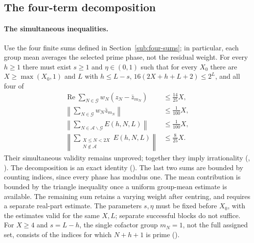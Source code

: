\subsection{The four-term decomposition}\label{sub:pivot}

\paragraph{The simultaneous inequalities.}
Use the four finite sums defined in Section~\ref{sub:four-sums}; in
particular, each group mean averages the selected prime phase, not the
residual weight. For every $h\ge 1$ there must exist $s\ge 1$ and $\eta\in(0,1)$ such that for
every $X_0$ there are $X\ge\max(X_0,1)$ and $L$ with $h\le L-s$,
$16(2X+h+L+2)\le 2^{L}$, and all four of
\[
\begin{aligned}
 \operatorname{Re}\sum_{N\in\mathcal G}w_N(z_N-\bar z_{m_N})
   &\le\tfrac{14}{25}X,\\
 \left\lVert\sum_{N\in\mathcal G}w_N\bar z_{m_N}\right\rVert
   &\le\tfrac{1}{100}X,\\
 \left\lVert\sum_{N\in\mathcal A\smallsetminus\mathcal G}E(h,N,L)\right\rVert
   &\le\tfrac{1}{100}X,\\
 \left\lVert\sum_{\substack{X\le N<2X\\N\notin\mathcal A}}E(h,N,L)\right\rVert
   &\le\tfrac{8}{25}X.
\end{aligned}
\]
Their simultaneous validity remains unproved; together they imply irrationality
(,
).
The decomposition is an exact identity
().
The last two sums are bounded by counting indices, since every
phase has modulus one. The mean contribution is bounded by the
triangle inequality once a uniform group-mean estimate is available.
The remaining sum retains a varying weight after centring, and
requires a separate real-part estimate. The parameters $s,\eta$ must
be fixed before $X_0$, with the estimates valid for the same $X,L$;
separate successful blocks do not suffice.
For $X\ge4$ and $s=L-h$, the single cofactor group
$m_N=1$, not the full assigned set, consists of the indices for which
$N+h+1$ is prime
().

